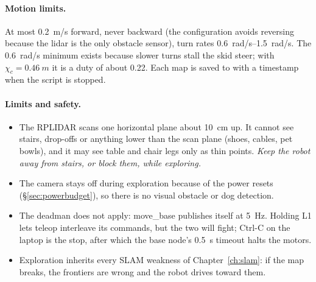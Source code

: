 \paragraph{Motion limits.} At most \SI{0.2}{m/s} forward, never backward
(the configuration avoids reversing because the lidar is the only obstacle
sensor), turn rates
\SIrange{0.6}{1.5}{rad/s}. The \SI{0.6}{rad/s} minimum exists because slower
turns stall the skid steer; with $\chi_c=\SI{0.46}{m}$ it is a duty of about
0.22. Each map is saved to  with a
timestamp when the script is stopped.

\paragraph{Limits and safety.}
\begin{itemize}
\item The RPLIDAR scans one horizontal plane about \SI{10}{cm} up. It cannot
  see stairs, drop-offs or anything lower than the scan plane (shoes, cables,
  pet bowls), and it may see table and chair legs only as thin points.
  \emph{Keep the robot away from stairs, or block them, while exploring.}
\item The camera stays off during exploration because of the power resets
  (\S\ref{sec:powerbudget}), so there is no visual obstacle or dog
  detection.
\item The deadman does not apply: move\_base publishes 
  itself at \SI{5}{Hz}. Holding L1 lets teleop interleave its commands, but
  the two will fight; Ctrl-C on the laptop is the stop, after which the base
  node's \SI{0.5}{s} timeout halts the motors.
\item Exploration inherits every SLAM weakness of Chapter~\ref{ch:slam}: if
  the map breaks, the frontiers are wrong and the robot drives toward them.
\end{itemize}
